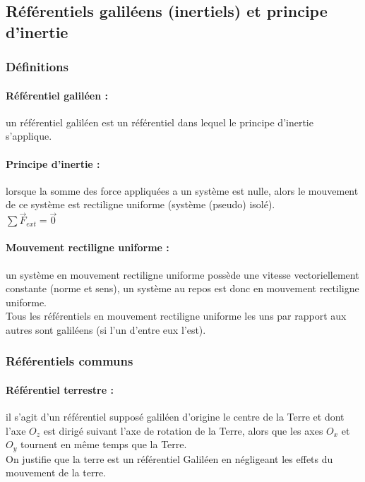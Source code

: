 \documentclass[a4paper,10pt]{book}
\begin{document}
\subsection{Référentiels galiléens (inertiels) et principe d'inertie}
\subsubsection{Définitions}

\paragraph{Référentiel galiléen :} un référentiel galiléen est un référentiel dans lequel le principe d'inertie s'applique.\\

\paragraph{Principe d'inertie :} lorsque la somme des force appliquées a un système est nulle, alors le mouvement de ce système est rectiligne uniforme (système (pseudo) isolé).\\
$\sum \vec{F}_{ext}=\vec{0}$\\

\paragraph{Mouvement rectiligne uniforme :} un système en mouvement rectiligne uniforme possède une vitesse vectoriellement constante (norme et sens), un système au repos est donc en mouvement rectiligne uniforme.\\
Tous les référentiels en mouvement rectiligne uniforme les uns par rapport aux autres sont galiléens (si l'un d'entre eux l'est).\\

\subsubsection{Référentiels communs\\}

\paragraph{Référentiel terrestre :} il s'agit d'un référentiel supposé galiléen d'origine le centre de la Terre et dont l'axe $O_{z}$ est dirigé suivant l'axe de rotation de la Terre, alors que les axes $O_{x}$ et $O_{y}$ tournent en même temps que la Terre.\\
On justifie que la terre est un référentiel Galiléen en négligeant les effets du mouvement de la terre.
\end{document}
